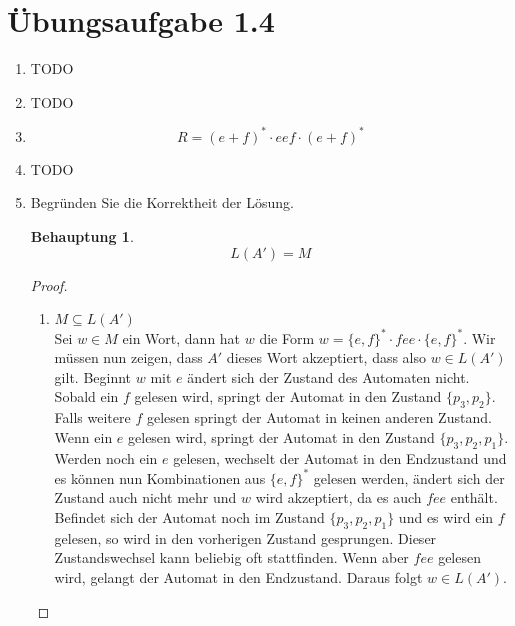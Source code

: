 \documentclass[a4paper]{scrartcl}
\newtheorem*{behaupt}{Behauptung}
\begin{document}
\section*{Übungsaufgabe 1.4}
\begin{enumerate}
    \item TODO
    \item TODO
    \item
        \begin{equation}
            R = (e + f)^* \cdot eef \cdot (e + f)^*
        \end{equation}
        
    \item TODO
    \item Begründen Sie die Korrektheit der Lösung. \\
        \begin{behaupt}
            \begin{equation*}
                L(A') = M
            \end{equation*}
        \end{behaupt}
        \begin{proof} \hfill \\
            \begin{enumerate}
                \item $M \subseteq L(A')$ \\
                    Sei $w \in M$ ein Wort, dann hat $w$ die Form 
                    $w = \{e,f\}^* \cdot fee \cdot \{e,f\}^*$.
                    Wir müssen nun zeigen, dass $A'$ dieses Wort akzeptiert, 
                    dass also $w \in L(A')$ gilt. Beginnt $w$ mit $e$ ändert
                    sich der Zustand des Automaten nicht. Sobald ein $f$ 
                    gelesen wird, springt der Automat in den Zustand 
                    $\{p_3,p_2\}$. Falls weitere $f$ gelesen springt der
                    Automat in keinen anderen Zustand. Wenn ein $e$ gelesen wird,
                    springt der Automat in den Zustand $\{p_3,p_2,p_1\}$.
                    Werden noch ein $e$ gelesen, wechselt der Automat in den Endzustand
                    und es können nun Kombinationen aus $\{e,f\}^*$ gelesen werden,
                    ändert sich der Zustand auch nicht mehr und $w$ wird akzeptiert,
                    da es auch $fee$ enthält. Befindet sich der Automat noch im Zustand
                    $\{p_3,p_2,p_1\}$ und es wird ein $f$ gelesen, so wird in den vorherigen 
                    Zustand gesprungen. Dieser Zustandswechsel kann beliebig oft stattfinden.
                    Wenn aber $fee$ gelesen wird, gelangt der Automat in den Endzustand.
                    Daraus folgt $w \in L(A')$.
                    

\end{enumerate}
\end{proof}
\end{enumerate}
\end{document}
